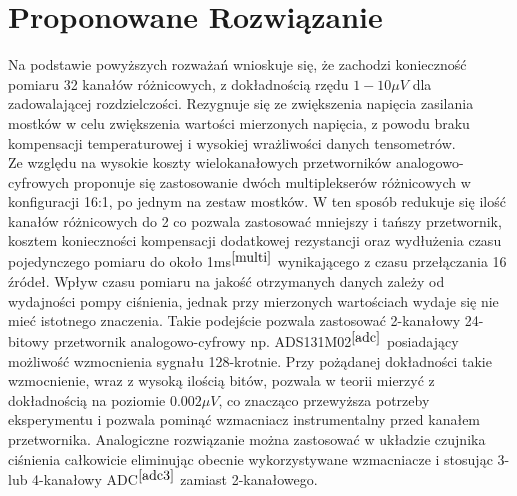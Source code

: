 \documentclass[12pt]{article}
\begin{document}
	 
\section{Proponowane Rozwiązanie}

	Na podstawie powyższych rozważań wnioskuje się, że zachodzi konieczność pomiaru 32 kanałów różnicowych, z dokładnością rzędu $1 - 10\mu V$ dla zadowalającej rozdzielczości. Rezygnuje się ze zwiększenia napięcia zasilania mostków w celu zwiększenia wartości mierzonych napięcia, z powodu braku kompensacji temperaturowej i wysokiej wrażliwości danych tensometrów.\\
	Ze względu na wysokie koszty wielokanałowych przetworników analogowo-cyfrowych proponuje się zastosowanie dwóch multiplekserów różnicowych w konfiguracji 16:1, po jednym na zestaw mostków. W ten sposób redukuje się ilość kanałów różnicowych do 2 co pozwala zastosować mniejszy i tańszy przetwornik, kosztem konieczności kompensacji dodatkowej rezystancji oraz wydłużenia czasu pojedynczego pomiaru do około 1ms$^{\cite{multi}}$ wynikającego z czasu przełączania 16 źródeł. Wpływ czasu pomiaru na jakość otrzymanych danych zależy od wydajności pompy ciśnienia, jednak przy mierzonych wartościach wydaje się nie mieć istotnego znaczenia. Takie podejście pozwala zastosować 2-kanałowy 24-bitowy przetwornik analogowo-cyfrowy np. ADS131M02$^{\cite{adc}}$ posiadający możliwość wzmocnienia sygnału 128-krotnie. Przy pożądanej dokładności takie wzmocnienie, wraz z wysoką ilością bitów, pozwala w teorii mierzyć z dokładnością na poziomie $0.002\mu V$, co znacząco przewyższa potrzeby eksperymentu i pozwala pominąć wzmacniacz instrumentalny przed kanałem przetwornika. Analogiczne rozwiązanie można zastosować w układzie czujnika ciśnienia całkowicie eliminując obecnie wykorzystywane wzmacniacze i stosując 3- lub 4-kanałowy ADC$^{\cite{adc3}}$ zamiast 2-kanałowego. 
\end{document}
